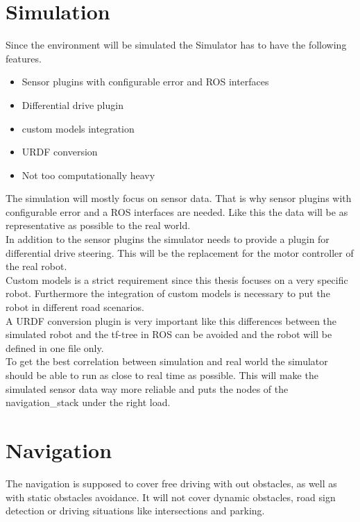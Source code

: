 \section{Simulation}
Since the environment will be simulated the Simulator has to have the following features.
\begin{itemize}
	\item Sensor plugins with configurable error and ROS interfaces
	\item Differential drive plugin
	\item custom models integration
	\item URDF conversion
	\item Not too computationally heavy
\end{itemize}

The simulation will mostly focus on sensor data. That is why sensor plugins with configurable error and a ROS interfaces are needed. Like this the data will be as representative as possible to the real world.\\

In addition to the sensor plugins the simulator needs to provide a plugin for differential drive steering. This will be the replacement for the motor controller of the real robot.\\

Custom models is a strict requirement since this thesis focuses on a very specific robot. Furthermore the integration of custom models is necessary to put the robot in different road scenarios.\\

A URDF conversion plugin is very important like this differences between the simulated robot and the tf-tree in ROS can be avoided and the robot will be defined in one file only.\\

To get the best correlation between simulation and real world the simulator should be able to run as close to real time as possible. This will make the simulated sensor data way more reliable and puts the nodes of the navigation\_stack under the right load.

\section{Navigation}
The navigation is supposed to cover free driving with out obstacles, as well as with static obstacles avoidance. It will not cover dynamic obstacles, road sign detection or driving situations like intersections and parking.\\

